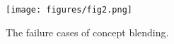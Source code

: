 \begin{figure}[t]
\begin{center}
\centerline{\texttt{[image: figures/fig2.png]}}  %
\caption{The failure cases of concept blending. }
\label{failure}
\end{center}
\vskip -0.4in
\end{figure}
